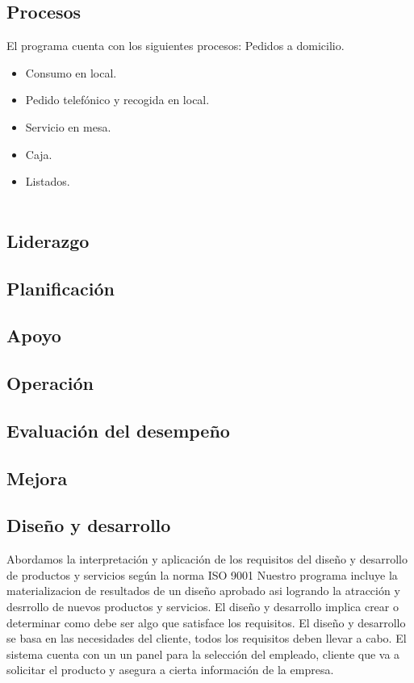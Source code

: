 \documentclass[12pt,a4paper]{article}
\begin{document}
\subsection{Procesos}
El programa cuenta con los siguientes procesos:
Pedidos a domicilio.
\begin{itemize}
\item Consumo en local.
\item Pedido telefónico y recogida en local.
\item Servicio en mesa.
\item Caja.
\item Listados.\\\\
\end{itemize}

\subsection{Liderazgo}
\subsection{Planificación}
\subsection{Apoyo}
\subsection{Operación}
\subsection{Evaluación del desempeño}
\subsection{Mejora}

\subsection{Diseño y desarrollo}
Abordamos la interpretación y aplicación de los requisitos del diseño y desarrollo de productos y servicios según la norma ISO 9001  
Nuestro programa incluye la materializacion de resultados de un diseño aprobado asi logrando la atracción y desrrollo de nuevos productos y servicios. El diseño y desarrollo implica crear o determinar como debe ser algo que satisface los requisitos. El diseño y desarrollo se basa en las necesidades del cliente, todos los requisitos deben llevar a cabo. El sistema cuenta con un un panel para la selección del empleado, cliente que va a solicitar el producto y asegura a cierta información de la empresa.\\\\
\end{document}
